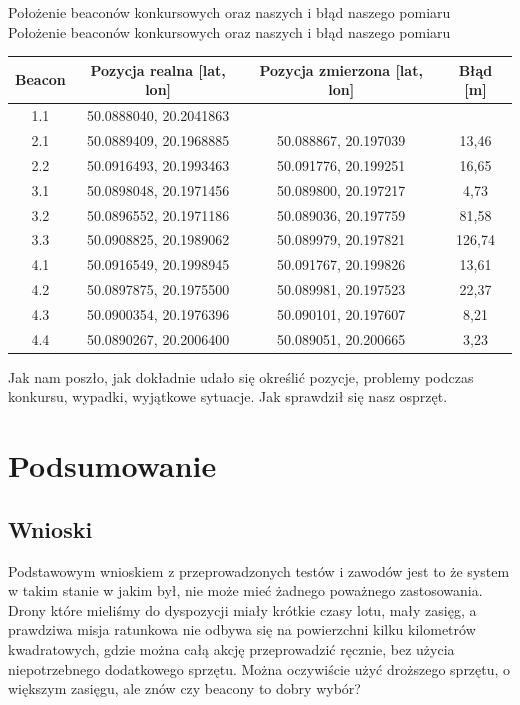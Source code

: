 \begin{tablica}
    {Położenie beaconów konkursowych oraz naszych i błąd naszego pomiaru}
    {Położenie beaconów konkursowych oraz naszych i błąd naszego pomiaru}
    {
    \begin{tabular}{|c|c|c|c|} \hline
	    \textbf{Beacon} & \textbf{Pozycja realna [lat, lon]} & \textbf{Pozycja zmierzona [lat, lon]} & \textbf{Błąd [m]} \\ \hline
	    1.1 & 50.0888040, 20.2041863 & & \\ \hline
	    2.1 & 50.0889409, 20.1968885 & 50.088867, 20.197039 & 13,46 \\ \hline
	    2.2 & 50.0916493, 20.1993463 & 50.091776, 20.199251 & 16,65 \\ \hline
	    3.1 & 50.0898048, 20.1971456 & 50.089800, 20.197217 & 4,73 \\ \hline
	    3.2 & 50.0896552, 20.1971186 & 50.089036, 20.197759 & 81,58 \\ \hline
	    3.3 & 50.0908825, 20.1989062 & 50.089979, 20.197821 & 126,74 \\ \hline
	    4.1 & 50.0916549, 20.1998945 & 50.091767, 20.199826 & 13,61 \\ \hline
	    4.2 & 50.0897875, 20.1975500 & 50.089981, 20.197523 & 22,37 \\ \hline
	    4.3 & 50.0900354, 20.1976396 & 50.090101, 20.197607 & 8,21 \\ \hline
	    4.4 & 50.0890267, 20.2006400 & 50.089051, 20.200665 & 3,23 \\ \hline
   \end{tabular}
    }
    \label{tab:polozeniebeaconowiblad}
\end{tablica}

Jak nam poszło, jak dokładnie udało się określić pozycje, problemy podczas konkursu, wypadki, wyjątkowe sytuacje. Jak sprawdził się nasz osprzęt.

\section{Podsumowanie}
\subsection{Wnioski}

Podstawowym wnioskiem z przeprowadzonych testów i zawodów jest to że system w takim stanie w jakim był, nie może mieć żadnego poważnego zastosowania. Drony które mieliśmy do dyspozycji miały krótkie czasy lotu, mały zasięg, a prawdziwa misja ratunkowa nie odbywa się na powierzchni kilku kilometrów kwadratowych, gdzie można całą akcję przeprowadzić ręcznie, bez użycia niepotrzebnego dodatkowego sprzętu. Można oczywiście użyć droższego sprzętu, o większym zasięgu, ale znów czy beacony to dobry wybór? 




